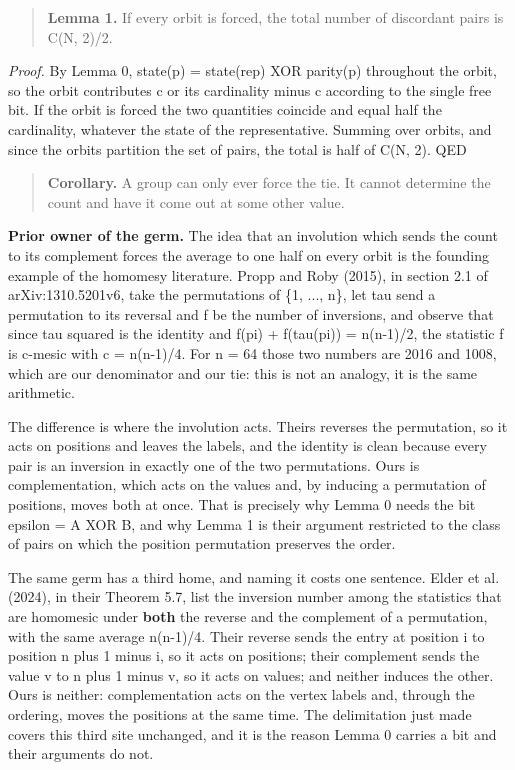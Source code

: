 \documentclass[11pt,a4paper]{article}
\begin{document}
\begin{quote}
\textbf{Lemma 1.} If every orbit is forced, the total number of discordant pairs is C(N, 2)/2.
\end{quote}

\emph{Proof.} By Lemma 0, state(p) = state(rep) XOR parity(p) throughout the orbit, so the orbit contributes c or its cardinality minus c according to the single free bit. If the orbit is forced the two quantities coincide and equal half the cardinality, whatever the state of the representative. Summing over orbits, and since the orbits partition the set of pairs, the total is half of C(N, 2). QED

\begin{quote}
\textbf{Corollary.} A group can only ever force the tie. It cannot determine the count and have it come out at some other value.
\end{quote}

\textbf{Prior owner of the germ.} The idea that an involution which sends the count to its complement forces the average to one half on every orbit is the founding example of the homomesy literature. Propp and Roby (2015), in section 2.1 of arXiv:1310.5201v6, take the permutations of \{1, ..., n\}, let tau send a permutation to its reversal and f be the number of inversions, and observe that since tau squared is the identity and f(pi) + f(tau(pi)) = n(n-1)/2, the statistic f is c-mesic with c = n(n-1)/4. For n = 64 those two numbers are 2016 and 1008, which are our denominator and our tie: this is not an analogy, it is the same arithmetic.

The difference is where the involution acts. Theirs reverses the permutation, so it acts on positions and leaves the labels, and the identity is clean because every pair is an inversion in exactly one of the two permutations. Ours is complementation, which acts on the values and, by inducing a permutation of positions, moves both at once. That is precisely why Lemma 0 needs the bit epsilon = A XOR B, and why Lemma 1 is their argument restricted to the class of pairs on which the position permutation preserves the order.

The same germ has a third home, and naming it costs one sentence. Elder et al. (2024), in their Theorem 5.7, list the inversion number among the statistics that are homomesic under \textbf{both} the reverse and the complement of a permutation, with the same average n(n-1)/4. Their reverse sends the entry at position i to position n plus 1 minus i, so it acts on positions; their complement sends the value v to n plus 1 minus v, so it acts on values; and neither induces the other. Ours is neither: complementation acts on the vertex labels and, through the ordering, moves the positions at the same time. The delimitation just made covers this third site unchanged, and it is the reason Lemma 0 carries a bit and their arguments do not.
\end{document}
